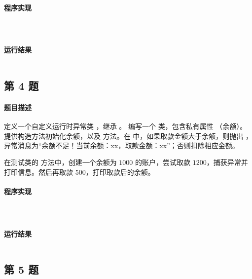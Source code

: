 \documentclass{academics}
\begin{document}
\paragraph{程序实现} {
    \inputminted[label=InvalidAgeException.java]{java}{../src/P03/InvalidAgeException.java}
    \inputminted[label=Person.java]{java}{../src/P03/Person.java}
    \inputminted[label=AgeTest.java]{java}{../src/P03/AgeTest.java}
}

\paragraph{运行结果} {
    \inputminted{text}{../res/P03.out}
}

\subsection{第 4 题}

\paragraph{题目描述} {
    定义一个自定义运行时异常类 ，继承 。
    编写一个  类，包含私有属性 （余额）。提供构造方法初始化余额，以及  方法。在  中，如果取款金额大于余额，则抛出 ，异常消息为``余额不足！当前余额：xx，取款金额：xx''；否则扣除相应金额。

    在测试类的  方法中，创建一个余额为 $1000$ 的账户，尝试取款 $1200$，捕获异常并打印信息。然后再取款 $500$，打印取款后的余额。
}

\paragraph{程序实现} {
    \inputminted[label=InsufficientBalanceException.java]{java}{../src/P04/InsufficientBalanceException.java}
    \inputminted[label=BankAccount.java]{java}{../src/P04/BankAccount.java}
    \inputminted[label=BankTest.java]{java}{../src/P04/BankTest.java}
}

\paragraph{运行结果} {
    \inputminted{text}{../res/P04.out}
}

\subsection{第 5 题}
\end{document}
